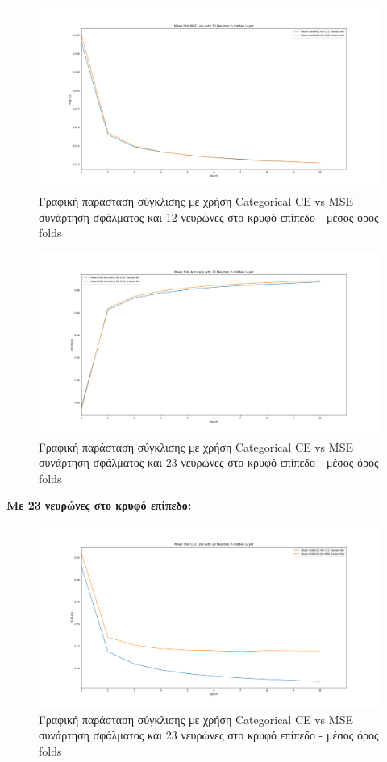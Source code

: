 \documentclass[12pt,a4paper]{article}
\begin{document}
\begin{figure}[H]
	\includegraphics[width=\textwidth]{Screenshots/14. CCE vs MSE - MSE Loss - 12 Neurons - Mean.png}
	\caption{Γραφική παράσταση σύγκλισης με χρήση Categorical CE vs MSE συνάρτηση σφάλματος και 12 νευρώνες στο κρυφό επίπεδο - μέσος όρος folds}
\end{figure}

\begin{figure}[H]
	\includegraphics[width=\textwidth]{Screenshots/15. CCE vs MSE - Accuracy - 12 Neurons - Mean.png}
	\caption{Γραφική παράσταση σύγκλισης με χρήση Categorical CE vs MSE συνάρτηση σφάλματος και 23 νευρώνες στο κρυφό επίπεδο - μέσος όρος folds}
\end{figure}

\textbf{Με 23 νευρώνες στο κρυφό επίπεδο:}

\begin{figure}[H]
	\includegraphics[width=\textwidth]{Screenshots/16. CCE vs MSE - CCE Loss - 23 Neurons - Mean.png}
	\caption{Γραφική παράσταση σύγκλισης με χρήση Categorical CE vs MSE συνάρτηση σφάλματος και 23 νευρώνες στο κρυφό επίπεδο - μέσος όρος folds}
\end{figure}
\end{document}
